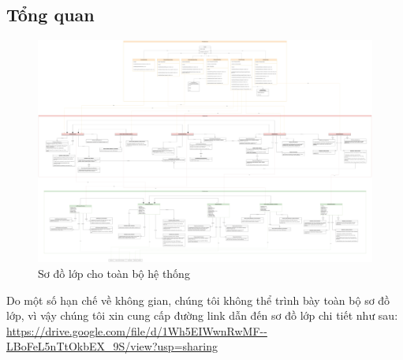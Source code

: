 \subsection{Tổng quan}
\begin{figure}[H]
    \centering
    \includegraphics[width=\linewidth]{Content/Phân tích và thiết kế hệ thống/documents/Sơ đồ lớp/images/LayerArchitect.png}
    \vspace{0.5cm}
    \caption{Sơ đồ lớp cho toàn bộ hệ thống}
    \label{fig:Sơ đồ lớp cho toàn bộ hệ thống}
\end{figure}

\par
Do một số hạn chế về không gian, chúng tôi không thể trình bày toàn bộ sơ đồ lớp,
vì vậy chúng tôi xin cung cấp đường link dẫn đến sơ đồ lớp chi tiết như sau:
\url{https://drive.google.com/file/d/1Wh5EIWwnRwMF--LBoFeL5nTtOkbEX_9S/view?usp=sharing}